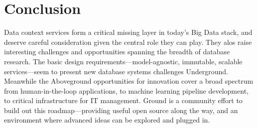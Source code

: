 \documentclass{sig-alternate}
\begin{document}

\section{Conclusion}
\label{sec:conclusion}
Data context services form a critical missing layer in today's Big Data stack, and deserve careful consideration given the central role they can play. They alos raise interesting challenges and opportunities spanning the breadth of database research. The basic design requirements---model-agnostic, immutable, scalable services---seem to present new database systems challenges Underground. Meanwhile the Aboveground opportunities for innovation cover a broad spectrum from human-in-the-loop applications, to machine learning pipeline development, to critical infrastructure for IT management.  Ground is a community effort to build out this roadmap---providing useful open source along the way, and an environment where advanced ideas can be explored and plugged in.


\end{document}

